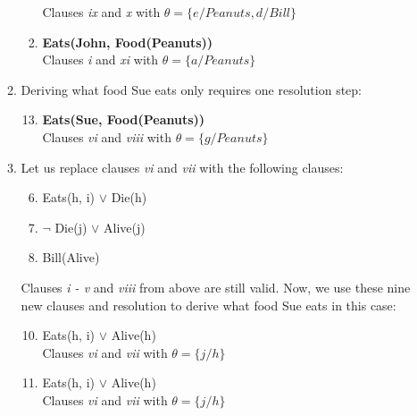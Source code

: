 \documentclass[12pt]{article}
\begin{document}
\begin{enumerate}
\begin{enumerate}
\begin{enumerate}
					Clauses \textit{ix} and \textit{x} with $ \theta = \{ e/Peanuts, d/Bill \} $
				\item \textbf{Eats(John, Food(Peanuts))} \\
					Clauses \textit{i} and \textit{xi} with $ \theta = \{ a/Peanuts \} $
			\end{enumerate}
			\item Deriving what food Sue eats only requires one resolution step:
			\begin{enumerate}
				\setcounter{enumiii}{12}
				\item \textbf{Eats(Sue, Food(Peanuts))} \\
					Clauses \textit{vi} and \textit{viii} with $ \theta = \{ g/Peanuts \} $
			\end{enumerate}
			\item Let us replace clauses \textit{vi} and \textit{vii} with the following clauses:
			\begin{enumerate}
				\setcounter{enumiii}{5}
				\item Eats(h, i) $\lor$ Die(h)
				\item $\neg$ Die(j) $\lor$ Alive(j)
				\setcounter{enumiii}{8}
				\item Bill(Alive)
			\end{enumerate}
			Clauses \textit{i - v} and \textit{viii} from above are still valid. Now, we use these nine new clauses and resolution to derive what food Sue eats in this case:
			\begin{enumerate}
				\setcounter{enumiii}{9}
				\item Eats(h, i) $\lor$ Alive(h) \\
					Clauses \textit{vi} and \textit{vii} with $ \theta = \{ j/h \} $
				\item Eats(h, i) $\lor$ Alive(h) \\
					Clauses \textit{vi} and \textit{vii} with $ \theta = \{ j/h \} $
			
			\end{enumerate}
				  
		\end{enumerate}	
\end{enumerate}
\end{document}
